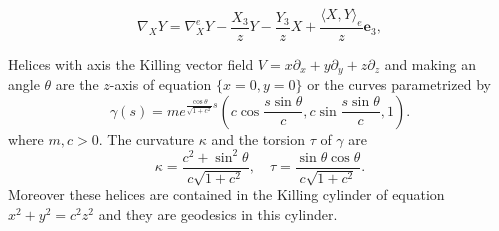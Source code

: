 \documentclass[10pt,a4paper]{amsart}
\def\e{\mathbf e}
\begin{document}
\begin{equation}\label{r}
\nabla_XY=\nabla^e_XY-\frac{X_3}{z}Y-\frac{Y_3}{z}X+\frac{\langle X,Y\rangle_e}{z}\e_3,
\end{equation}

  \begin{theorem}\label{t31}
   Helices with axis the Killing vector field $V=x\partial_x+y\partial_y+z\partial_z$ and making an angle $\theta$ are the $z$-axis of equation $\{x=0,y=0\}$ or the curves parametrized by 
  \begin{equation}\label{h0}
 \gamma(s)=me^{\frac{\cos\theta}{\sqrt{1+c^2}}s}\left(c \cos\frac{s\sin\theta}{c},c \sin \frac{s\sin\theta}{c}, 1\right).
 \end{equation}
where $m,c>0$. The curvature $\kappa$ and the torsion $\tau$ of $\gamma$   are
\begin{equation}\label{h01}
\kappa=\frac{c^2+\sin^2\theta}{c\sqrt{1+c^2}},\quad \tau=\frac{\sin\theta\cos\theta}{c\sqrt{1+c^2}}.
\end{equation}
Moreover these helices are contained in the Killing cylinder of equation $x^2+y^2=c^2z^2$ and they are geodesics in this cylinder.
  \end{theorem}
\end{document}
